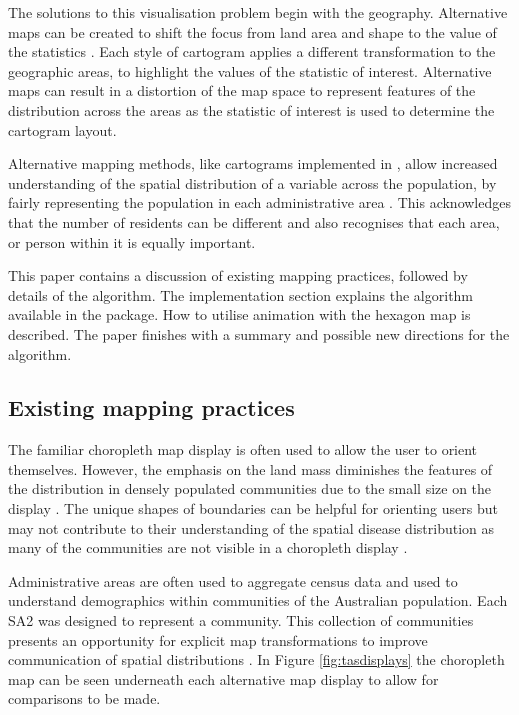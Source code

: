 The solutions to this visualisation problem begin with the geography.
Alternative maps can be created to shift the focus from land area and
shape to the value of the statistics \citep{ACCAC}. Each style of
cartogram applies a different transformation to the geographic areas, to
highlight the values of the statistic of interest. Alternative maps can
result in a distortion of the map space to represent features of the
distribution across the areas \citep{ACCAC} as the statistic of interest
is used to determine the cartogram layout.

Alternative mapping methods, like cartograms implemented in
, allow increased understanding of the spatial
distribution of a variable across the population, by fairly representing
the population in each administrative area \citep{TAAM}. This
acknowledges that the number of residents can be different and also
recognises that each area, or person within it is equally important.

This paper contains a discussion of existing mapping practices, followed
by details of the algorithm. The implementation section explains the
algorithm available in the  package. How to utilise
animation with the hexagon map is described. The paper finishes with a
summary and possible new directions for the algorithm.

\hypertarget{existing-mapping-practices}{%
\subsection{Existing mapping
practices}\label{existing-mapping-practices}}

The familiar choropleth map display is often used to allow the user to
orient themselves. However, the emphasis on the land mass diminishes the
features of the distribution in densely populated communities due to the
small size on the display \citep{ACTUC}. The unique shapes of boundaries
can be helpful for orienting users but may not contribute to their
understanding of the spatial disease distribution as many of the
communities are not visible in a choropleth display \citep{TVSSS}.

Administrative areas are often used to aggregate census data and used to
understand demographics within communities of the Australian population.
Each SA2 \citep{abs2011} was designed to represent a community. This
collection of communities presents an opportunity for explicit map
transformations to improve communication of spatial distributions
\citep{CBATCC}. In Figure \ref{fig:tasdisplays} the choropleth map can
be seen underneath each alternative map display to allow for comparisons
to be made.

